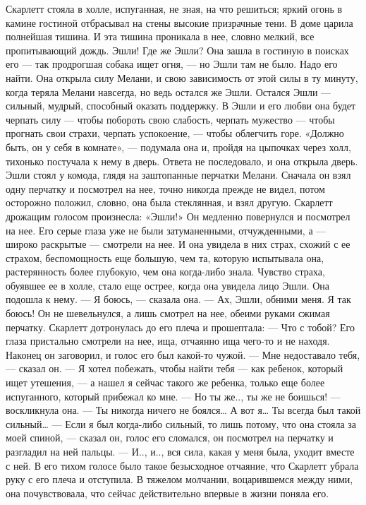 Скарлетт стояла в холле, испуганная, не зная, на что решиться; яркий огонь в камине гостиной отбрасывал на стены высокие призрачные тени. В доме царила полнейшая тишина. И эта тишина проникала в нее, словно мелкий, все пропитывающий дождь. Эшли! Где же Эшли?
Она зашла в гостиную в поисках его — так продрогшая собака ищет огня, — но Эшли там не было. Надо его найти. Она открыла силу Мелани, и свою зависимость от этой силы в ту минуту, когда теряла Мелани навсегда, но ведь остался же Эшли. Остался Эшли — сильный, мудрый, способный оказать поддержку. В Эшли и его любви она будет черпать силу — чтобы побороть свою слабость, черпать мужество — чтобы прогнать свои страхи, черпать успокоение, — чтобы облегчить горе.
«Должно быть, он у себя в комнате», — подумала она и, пройдя на цыпочках через холл, тихонько постучала к нему в дверь. Ответа не последовало, и она открыла дверь. Эшли стоял у комода, глядя на заштопанные перчатки Мелани. Сначала он взял одну перчатку и посмотрел на нее, точно никогда прежде не видел, потом осторожно положил, словно, она была стеклянная, и взял другую.
Скарлетт дрожащим голосом произнесла: «Эшли!» Он медленно повернулся и посмотрел на нее. Его серые глаза уже не были затуманенными, отчужденными, а — широко раскрытые — смотрели на нее. И она увидела в них страх, схожий с ее страхом, беспомощность еще большую, чем та, которую испытывала она, растерянность более глубокую, чем она когда-либо знала. Чувство страха, обуявшее ее в холле, стало еще острее, когда она увидела лицо Эшли. Она подошла к нему.
— Я боюсь, — сказала она. — Ах, Эшли, обними меня. Я так боюсь!
Он не шевельнулся, а лишь смотрел на нее, обеими руками сжимая перчатку. Скарлетт дотронулась до его плеча и прошептала:
— Что с тобой?
Его глаза пристально смотрели на нее, ища, отчаянно ища чего-то и не находя. Наконец он заговорил, и голос его был какой-то чужой.
— Мне недоставало тебя, — сказал он. — Я хотел побежать, чтобы найти тебя — как ребенок, который ищет утешения, — а нашел я сейчас такого же ребенка, только еще более испуганного, который прибежал ко мне.
— Но ты же.., ты же не боишься! — воскликнула она. — Ты никогда ничего не боялся… А вот я… Ты всегда был такой сильный…
— Если я был когда-либо сильный, то лишь потому, что она стояла за моей спиной, — сказал он, голос его сломался, он посмотрел на перчатку и разгладил на ней пальцы. — И.., и.., вся сила, какая у меня была, уходит вместе с ней.
В его тихом голосе было такое безысходное отчаяние, что Скарлетт убрала руку с его плеча и отступила. В тяжелом молчании, воцарившемся между ними, она почувствовала, что сейчас действительно впервые в жизни поняла его.
